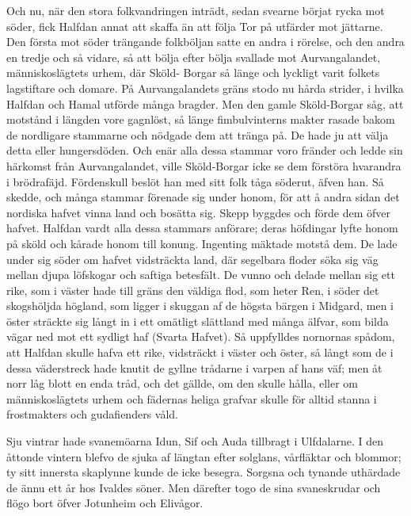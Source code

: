 Och nu, när den stora folkvandringen inträdt, sedan svearne börjat rycka
mot söder, fick Halfdan annat att skaffa än att följa Tor på utfärder
mot jättarne. Den första mot söder trängande folkböljan satte en andra i
rörelse, och den andra en tredje och så vidare, så att bölja efter bölja
svallade mot Aurvangalandet, människoslägtets urhem, där Sköld- Borgar
så länge och lyckligt varit folkets lagstiftare och domare. På
Aurvangalandets gräns stodo nu hårda strider, i hvilka Halfdan och Hamal
utförde många bragder. Men den gamle Sköld-Borgar såg, att motstånd i
längden vore gagnlöst, så länge fimbulvinterns makter rasade bakom de
nordligare stammarne och nödgade dem att tränga på. De hade ju att välja
detta eller hungersdöden. Och enär alla dessa stammar voro fränder och
ledde sin härkomst från
Aurvangalandet,
ville Sköld-Borgar icke se dem förstöra hvarandra i brödrafäjd.
Fördenskull beslöt han med sitt folk tåga söderut, äfven han. Så skedde,
och många stammar förenade sig under honom, för att å andra sidan det
nordiska hafvet vinna land och bosätta sig. Skepp byggdes och förde dem
öfver hafvet. Halfdan vardt alla dessa stammars anförare; deras
höfdingar lyfte honom på sköld och kårade honom till konung. Ingenting
mäktade motstå dem. De lade under sig söder om hafvet vidsträckta land,
där segelbara floder söka sig väg mellan djupa löfskogar och saftiga
betesfält. De vunno och delade mellan sig ett rike, som i väster hade
till gräns den väldiga flod, som heter Ren, i söder det skogshöljda
högland, som ligger i skuggan af de högsta bärgen i Midgard, men i öster
sträckte sig långt in i ett omätligt slättland med många älfvar, som
bilda vägar ned mot ett sydligt haf (Svarta Hafvet). Så uppfylldes
nornornas spådom, att Halfdan skulle hafva ett rike, vidsträckt i väster
och öster, så långt som de i dessa väderstreck hade knutit de gyllne
trådarne i varpen af hans väf; men åt norr låg blott en enda tråd, och
det gällde, om den skulle hålla, eller om människoslägtets urhem och
fädernas heliga grafvar skulle för alltid stanna i frostmakters och
gudafienders våld.



Sju vintrar hade svanemöarna Idun, Sif och Auda tillbragt i Ulfdalarne.
I den åttonde vintern blefvo de sjuka af längtan efter solglans,
vårfläktar och blommor; ty sitt innersta skaplynne kunde de icke
besegra. Sorgsna och tynande uthärdade de ännu ett år hos Ivaldes söner.
Men därefter togo de sina svaneskrudar och flögo bort öfver Jotunheim
och Elivågor.

